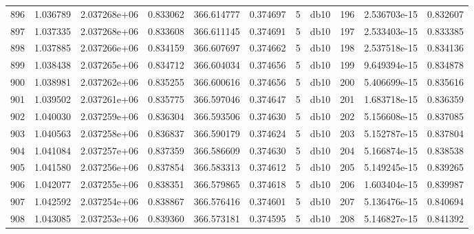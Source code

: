 \begin{tabular}{lrrrrrrlrrr}
896  &    1.036789 &        2.037268e+06 &  0.833062 &              366.614777 &    0.374697 &       5 &         db10 &    196 &   2.536703e-15 &      0.832607 \\
897  &    1.037335 &        2.037268e+06 &  0.833608 &              366.611145 &    0.374691 &       5 &         db10 &    197 &   2.533403e-15 &      0.833385 \\
898  &    1.037885 &        2.037266e+06 &  0.834159 &              366.607697 &    0.374662 &       5 &         db10 &    198 &   2.537518e-15 &      0.834136 \\
899  &    1.038438 &        2.037265e+06 &  0.834712 &              366.604034 &    0.374656 &       5 &         db10 &    199 &   9.649394e-15 &      0.834878 \\
900  &    1.038981 &        2.037262e+06 &  0.835255 &              366.600616 &    0.374656 &       5 &         db10 &    200 &   5.406699e-15 &      0.835616 \\
901  &    1.039502 &        2.037261e+06 &  0.835775 &              366.597046 &    0.374647 &       5 &         db10 &    201 &   1.683718e-15 &      0.836359 \\
902  &    1.040030 &        2.037259e+06 &  0.836304 &              366.593506 &    0.374630 &       5 &         db10 &    202 &   5.156608e-15 &      0.837085 \\
903  &    1.040563 &        2.037258e+06 &  0.836837 &              366.590179 &    0.374624 &       5 &         db10 &    203 &   5.152787e-15 &      0.837804 \\
904  &    1.041084 &        2.037257e+06 &  0.837359 &              366.586609 &    0.374630 &       5 &         db10 &    204 &   5.166874e-15 &      0.838538 \\
905  &    1.041580 &        2.037256e+06 &  0.837854 &              366.583313 &    0.374612 &       5 &         db10 &    205 &   5.149245e-15 &      0.839265 \\
906  &    1.042077 &        2.037255e+06 &  0.838351 &              366.579865 &    0.374618 &       5 &         db10 &    206 &   1.603404e-15 &      0.839987 \\
907  &    1.042592 &        2.037254e+06 &  0.838867 &              366.576416 &    0.374601 &       5 &         db10 &    207 &   5.136476e-15 &      0.840694 \\
908  &    1.043085 &        2.037253e+06 &  0.839360 &              366.573181 &    0.374595 &       5 &         db10 &    208 &   5.146827e-15 &      0.841392 \\

\end{tabular}
